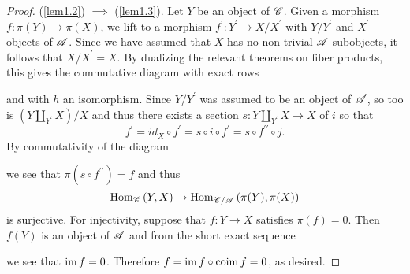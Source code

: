 \documentclass[dissertation.tex]{subfiles}
\begin{document}
\begin{lem}
\begin{proof}
    (\ref{lem1.2}) $\implies$ (\ref{lem1.3}).  Let $Y$ be an object of $\mathscr{C}$.
    Given a morphism $f : \pi(Y) \rightarrow \pi(X)$, we lift to a morphism $f^\prime \colon Y^\prime \rightarrow X/X^\prime$ with $Y/Y^\prime$ and $X^\prime$ objects of $\mathscr{A}$.
    Since we have assumed that $X$ has no non-trivial $\mathscr{A}$-subobjects, it follows that $X/X^\prime = X$.
    By dualizing the relevant theorems on fiber products, this gives the commutative diagram with exact rows
    \begin{center}
    \end{center}
    and with $h$ an isomorphism.
    Since $Y/Y^\prime$ was assumed to be an object of $\mathscr{A}$, so too is $\left(Y \coprod_{Y^\prime} X\right)/X$ and thus there exists a section $s : Y \coprod_{Y^\prime} X \rightarrow X$ of $i$ so that
    $$f^\prime = id_X \circ f^\prime = s\circ i \circ f^\prime = s \circ f^{\prime\prime} \circ j.$$
    By commutativity of the diagram
    \begin{center}
    \end{center}
    we see that $\pi(s \circ f^{\prime\prime}) = f$ and thus
    $$\operatorname{Hom}_{\mathscr{C}}\left(Y,X\right) \rightarrow \operatorname{Hom}_{\mathscr{C}/\mathscr{A}}\left(\pi(Y), \pi(X)\right)$$
    is surjective.
    For injectivity, suppose that $f \colon Y \rightarrow X$ satisfies $\pi(f) = 0$.
    Then $f(Y)$ is an object of $\mathscr{A}$ and from the short exact sequence
    \begin{center}
    \end{center}
    we see that $\operatorname{im}{f} = 0$.
    Therefore $f = \operatorname{im}{f} \circ \operatorname{coim}{f} = 0$, as desired.
    

\end{proof}
\end{lem}
\end{document}
